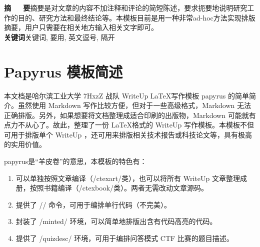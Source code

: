 \documentclass[a4paper,UTF8]{ctexart}
\begin{document}
\title{\pubtitle}

\renewcommand{\Authsep}{, }
\renewcommand{\Authand}{}
\renewcommand{\Authands}{}

\author{7HxzZ}

\author{作者2}

\author{\authorcr 作者3}

\maketitle

\begin{center}
\parbox{0.9\textwidth}{
\textbf{摘~~~要}\quad 摘要是对文章的内容不加注释和评论的简短陈述，要求扼要地说明研究工作的目的、研究方法和最终结论等。本模板目前是用一种非常ad-hoc方法实现排版摘要，用户只需要在相关地方输入相关文字即可。\\
\textbf{关键词}\quad 关键词, 要用, 英文逗号, 隔开\\}
\end{center}

\section{Papyrus 模板简述}

本文档是哈尔滨工业大学 7HxzZ 战队 WriteUp \LaTeX 写作模板 papyrus 的简单简介。虽然使用 Markdown 写作比较方便，但对于一些高级格式，Markdown 无法正确排版。另外，如果想要将文档整理成适合印刷的出版物，Markdown 可能就有点力不从心了。故此，整理了一份 \LaTeX 格式的 WriteUp 写作模板。本模板不但可用于排版单个 WriteUp ，还可用来排版相关技术报告或科技论文等，具有极高的实用价值。

papyrus是“羊皮卷”的意思，本模板的特色有：

\begin{enumerate}
	\item 可以单独按照文章编译（\code/ctexart/类），也可以将所有 WriteUp 文章整理成册，按照书籍编译（\code/ctexbook/类）。两者无需改动文章源码。
	\item 提供了 \code/\code/ 命令，可用于编排单行代码（不完美）。
	\item 封装了 \code/minted/ 环境，可以简单地排版出含有代码高亮的代码。
	\item 提供了 \code/quizdesc/ 环境，可用于编排问答模式 CTF 比赛的题目描述。
\end{enumerate}
\end{document}
